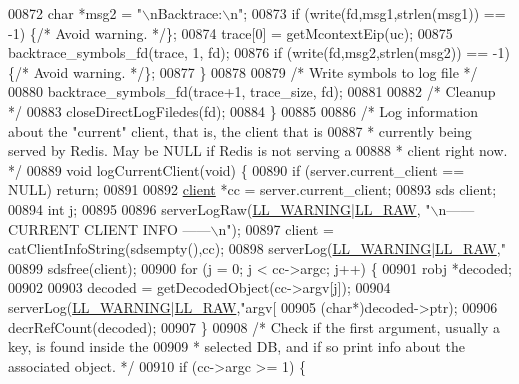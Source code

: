 \begin{DoxyCode}
{{{{{{{{{{{{{{{{{{{{{{{{{{{{{{{{{{{{{{{{{{{{{{{{{{{{{{{{{{{{{{00872         \textcolor{keywordtype}{char} *msg2 = \textcolor{stringliteral}{"\(\backslash\)nBacktrace:\(\backslash\)n"};
00873         \textcolor{keywordflow}{if} (write(fd,msg1,strlen(msg1)) == -1) \{\textcolor{comment}{/* Avoid warning. */}\};
00874         trace[0] = getMcontextEip(uc);
00875         backtrace\_symbols\_fd(trace, 1, fd);
00876         \textcolor{keywordflow}{if} (write(fd,msg2,strlen(msg2)) == -1) \{\textcolor{comment}{/* Avoid warning. */}\};
00877     \}
00878 
00879     \textcolor{comment}{/* Write symbols to log file */}
00880     backtrace\_symbols\_fd(trace+1, trace\_size, fd);
00881 
00882     \textcolor{comment}{/* Cleanup */}
00883     closeDirectLogFiledes(fd);
00884 \}
00885 
00886 \textcolor{comment}{/* Log information about the "current" client, that is, the client that is}
00887 \textcolor{comment}{ * currently being served by Redis. May be NULL if Redis is not serving a}
00888 \textcolor{comment}{ * client right now. */}
00889 \textcolor{keywordtype}{void} logCurrentClient(\textcolor{keywordtype}{void}) \{
00890     \textcolor{keywordflow}{if} (server.current\_client == NULL) \textcolor{keywordflow}{return};
00891 
00892     \hyperlink{structclient}{client} *cc = server.current\_client;
00893     sds client;
00894     \textcolor{keywordtype}{int} j;
00895 
00896     serverLogRaw(\hyperlink{server_8h_a31229b9334bba7d6be2a72970967a14b}{LL\_WARNING}|\hyperlink{server_8h_a6b3768a4d2dfb3ac580b8d999baa9350}{LL\_RAW}, \textcolor{stringliteral}{"\(\backslash\)n------ CURRENT CLIENT INFO ------\(\backslash\)n"});
00897     client = catClientInfoString(sdsempty(),cc);
00898     serverLog(\hyperlink{server_8h_a31229b9334bba7d6be2a72970967a14b}{LL\_WARNING}|\hyperlink{server_8h_a6b3768a4d2dfb3ac580b8d999baa9350}{LL\_RAW},\textcolor{stringliteral}{"%
00899     sdsfree(client);
00900     \textcolor{keywordflow}{for} (j = 0; j < cc->argc; j++) \{
00901         robj *decoded;
00902 
00903         decoded = getDecodedObject(cc->argv[j]);
00904         serverLog(\hyperlink{server_8h_a31229b9334bba7d6be2a72970967a14b}{LL\_WARNING}|\hyperlink{server_8h_a6b3768a4d2dfb3ac580b8d999baa9350}{LL\_RAW},\textcolor{stringliteral}{"argv[%
00905             (\textcolor{keywordtype}{char}*)decoded->ptr);
00906         decrRefCount(decoded);
00907     \}
00908     \textcolor{comment}{/* Check if the first argument, usually a key, is found inside the}
00909 \textcolor{comment}{     * selected DB, and if so print info about the associated object. */}
00910     \textcolor{keywordflow}{if} (cc->argc >= 1) \{
}}}}}}}}}}}}}}}}}}}}}}}}}}}}}}}}}}}}}}}}}}}}}}}}}}}}}}}}}}}}}}}}
\end{DoxyCode}
